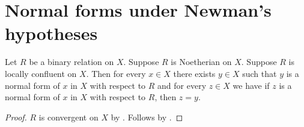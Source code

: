 


\section{Normal forms under Newman's hypotheses}

\begin{corollary}\label{newman_relation_unique_normal_forms}
    Let $R$ be a binary relation on $X$.
    Suppose $R$ is Noetherian on $X$.
    Suppose $R$ is locally confluent on $X$.
    Then for every $x\in X$ there exists $y\in X$ such that
        $y$ is a normal form of $x$ in $X$ with respect to $R$ and
        for every $z\in X$ we have if
            $z$ is a normal form of $x$ in $X$ with respect to $R$,
            then $z=y$.
\end{corollary}
\begin{proof}
    $R$ is convergent on $X$ by .
    Follows by .
\end{proof}
